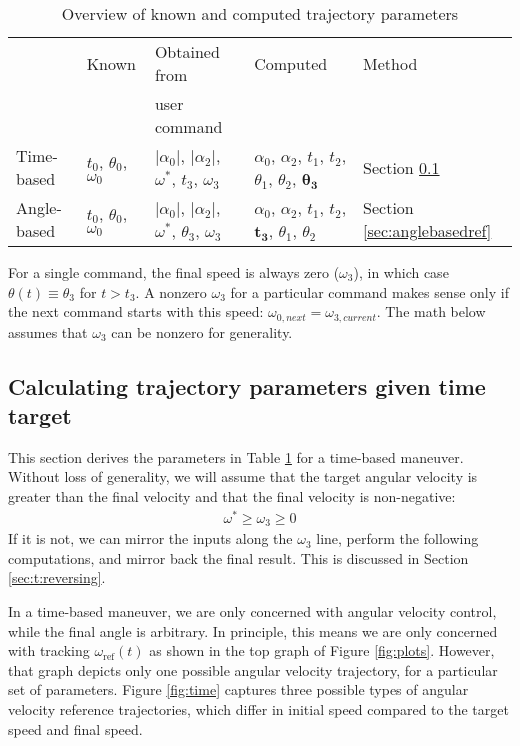\documentclass[12pt, a4paper]
{article}
\providecommand{\sub}[1]{_{\text{#1}}}
\providecommand{\w}{\omega}
\providecommand{\wt}{\w^*}
\providecommand{\wref}{\w\sub{ref}}
\renewcommand{\th}{\theta}
\renewcommand{\a}{\alpha}
\providecommand{\abs}[1]{\left|#1\right|}
\begin{document}
\begin{table}[H]
    \centering
    \caption{Overview of known and computed trajectory parameters}
    \label{tab:parameters}
    \begin{tabular}{@{}lllll@{}}
    \toprule
                & Known    & Obtained from & Computed & Method \\
                &          & user command  &          &        \\ \midrule
    Time-based  &
        $t_0$, $\th_0$, $\w_0$ &
        $\abs{\a_0}$, $\abs{\a_2}$, $\wt$, $t_3$, $\w_3$ &
        $\a_0$, $\a_2$, $t_1$, $t_2$, $\th_1$, $\th_2$, $\boldsymbol{\th_3}$
        & Section \ref{sec:timebasedref}\\
    Angle-based &
        $t_0$, $\th_0$, $\w_0$ &
        $\abs{\a_0}$, $\abs{\a_2}$, $\wt$, $\th_3$, $\w_3$ &
        $\a_0$, $\a_2$, $t_1$, $t_2$, $\boldsymbol{t_3}$, $\th_1$, $\th_2$ &
        Section \ref{sec:anglebasedref}  \\
        \bottomrule
    \end{tabular}
\end{table}

For a single command, the final speed is always zero ($\w_3$), in which case
$\th(t) \equiv \th_3$ for $t > t_3$. A nonzero $\w_3$ for a particular command
makes sense only if the next command starts with this speed: $\w_{0, next} =
\w_{3, current}$. The math below assumes that $\w_3$ can be nonzero for
generality.


\subsection{Calculating trajectory parameters given time target}
\label{sec:timebasedref}
This section derives the parameters in Table \ref{tab:parameters} for a
time-based maneuver. Without loss of generality, we will assume that the
target angular velocity is greater than the final velocity and that the final
velocity is non-negative:
%
\begin{align}
    \label{eq:t:forwardmaneuver}
    \wt \geq \w_3 \geq 0
\end{align}
%
If it is not, we can mirror the inputs along the $\w_3$ line, perform the
following computations, and mirror back the final result. This is discussed
in Section \ref{sec:t:reversing}.

In a time-based maneuver, we are only concerned with angular velocity control,
while the final angle is arbitrary. In principle, this means we are only
concerned with tracking $\wref(t)$ as shown in the top graph of
Figure \ref{fig:plots}. However, that graph depicts only one possible angular
velocity trajectory, for a particular set of parameters.
Figure \ref{fig:time} captures three possible types of angular velocity
reference trajectories, which differ in initial speed compared to the
target speed and final speed.
\end{document}
